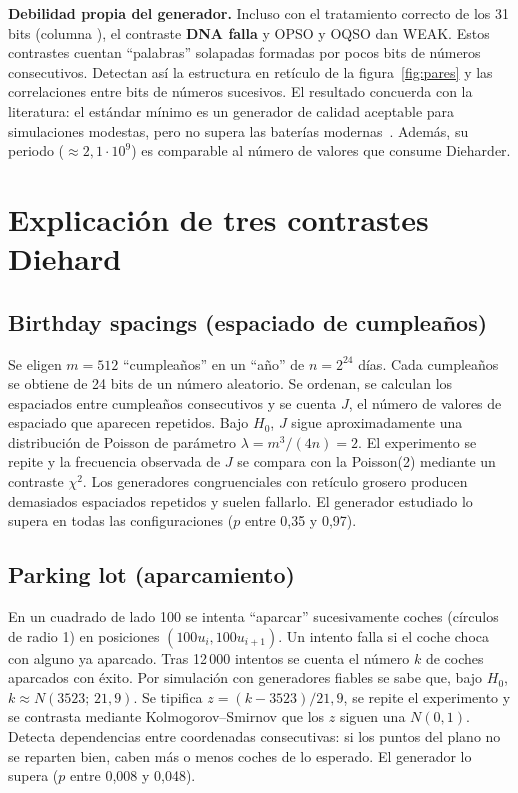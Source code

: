 \documentclass[a4paper,11pt]{article}
\begin{document}
\textbf{Debilidad propia del generador.} Incluso con el tratamiento correcto de
los 31 bits (columna ), el contraste \textbf{DNA falla} y OPSO y
OQSO dan WEAK. Estos contrastes cuentan \enquote{palabras} solapadas formadas
por pocos bits de números consecutivos. Detectan así la estructura en retículo
de la figura~\ref{fig:pares} y las correlaciones entre bits de números
sucesivos. El resultado concuerda con la literatura: el estándar mínimo es un
generador de calidad aceptable para simulaciones modestas, pero no supera las
baterías modernas~\cite{lecuyer}. Además, su periodo ($\approx2{,}1\cdot10^9$)
es comparable al número de valores que consume Dieharder.

\section{Explicación de tres contrastes Diehard}\label{sec:tres}

\subsection{Birthday spacings (espaciado de cumpleaños)}

Se eligen $m=512$ \enquote{cumpleaños} en un \enquote{año} de $n=2^{24}$ días.
Cada cumpleaños se obtiene de 24 bits de un número aleatorio. Se ordenan, se
calculan los espaciados entre cumpleaños consecutivos y se cuenta $J$, el número
de valores de espaciado que aparecen repetidos. Bajo $H_0$, $J$ sigue
aproximadamente una distribución de Poisson de parámetro
$\lambda = m^3/(4n) = 2$. El experimento se repite y la frecuencia observada de
$J$ se compara con la Poisson(2) mediante un contraste $\chi^2$. Los
generadores congruenciales con retículo grosero producen demasiados espaciados
repetidos y suelen fallarlo. El generador estudiado lo supera en todas las
configuraciones ($p$ entre 0,35 y 0,97).

\subsection{Parking lot (aparcamiento)}

En un cuadrado de lado 100 se intenta \enquote{aparcar} sucesivamente coches
(círculos de radio 1) en posiciones $(100u_i, 100u_{i+1})$. Un intento falla si
el coche choca con alguno ya aparcado. Tras 12\,000 intentos se cuenta el número
$k$ de coches aparcados con éxito. Por simulación con generadores fiables se
sabe que, bajo $H_0$, $k \approx N(3523;\, 21{,}9)$. Se tipifica
$z=(k-3523)/21{,}9$, se repite el experimento y se contrasta mediante
Kolmogorov--Smirnov que los $z$ siguen una $N(0,1)$. Detecta dependencias entre
coordenadas consecutivas: si los puntos del plano no se reparten bien, caben más
o menos coches de lo esperado. El generador lo supera ($p$ entre 0,008 y 0,048).
\end{document}
